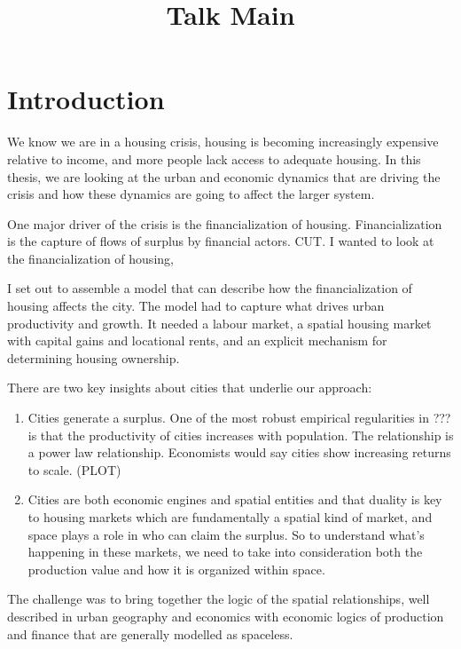 \documentclass[]{article}
\title{Talk Main}
\begin{document}
\maketitle

\section{Introduction} 
We know we are in a housing crisis, housing is becoming increasingly expensive relative to income, and more people lack access to adequate housing. In this thesis, we are looking at the urban and economic dynamics that are driving the crisis and how these dynamics are going to affect the larger system.

One major driver of the crisis is the financialization of housing. Financialization is the capture of flows of surplus by financial actors. CUT. %
I wanted to look at the financialization of housing, 

I set out to assemble a model that can describe how the financialization of housing affects the city. %
The model had to capture what drives urban productivity and growth. It needed a labour market, a spatial housing market with capital gains and locational rents, and an explicit mechanism for determining housing ownership.

There are two key insights about cities that underlie our approach:

\begin{enumerate}
    \item Cities generate a surplus. One of the most robust empirical regularities in ??? is that the productivity of cities increases with population. The relationship is a power law relationship. %
    Economists would say cities show increasing returns to scale. (PLOT)

    \item Cities are both economic engines and spatial entities and that duality is key to housing markets which are fundamentally a spatial kind of market, and space plays a role in who can claim the surplus. So to understand what’s happening in these markets, we need to take into consideration both the production value and how it is organized within space.
\end{enumerate}

The challenge was to bring together the logic of the spatial relationships, well described in urban geography and economics with economic logics of production and finance that are generally modelled as spaceless.
\end{document}

